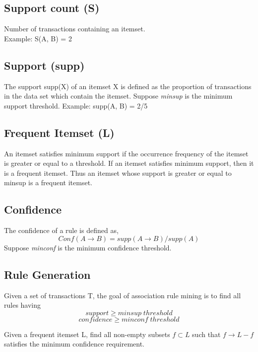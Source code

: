 \subsection{Support count (S)}
Number of transactions containing an itemset. \\
Example: S({A, B}) = 2

\subsection{Support (supp)}
The support supp(X) of an itemset X is defined as the proportion of transactions in the data set which contain the itemset.
Suppose \textit{minsup} is the minimum support threshold.
Example: supp({A, B}) = 2/5

\subsection{Frequent Itemset (L)}
An itemset satisfies minimum support if the occurrence frequency of the itemset
is greater or equal to a threshold. If an itemset satisfies minimum support, then it is a frequent itemset.
Thus an itemset whose support is greater or equal to minsup is a frequent itemset.

\subsection{Confidence}
The confidence of a rule is defined as,\\
\begin{equation}
Conf(A \rightarrow B) = supp(A \rightarrow  B) / supp(A)
\end{equation}
Suppose \textit{minconf} is the minimum confidence threshold.

\subsection{Rule Generation}
Given a set of transactions T, the goal of association rule mining is to find all rules having\\
\begin{equation}
support \geq minsup \; threshold
\end{equation}
\begin{equation}
confidence \geq minconf \; threshold
\end{equation}

Given a frequent itemset L, find all non-empty subsets $f \subset L$ such that $f \rightarrow  L - f$ satisfies the minimum confidence requirement.

